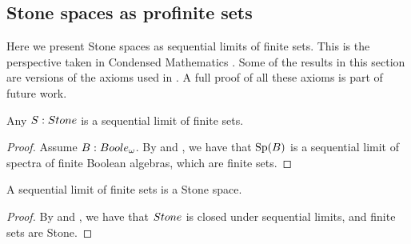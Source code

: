 
\subsection{Stone spaces as profinite sets}
Here we present Stone spaces as sequential limits of finite sets. 
This is the perspective taken in Condensed Mathematics \cite{Condensed,Dagur,Scholze}.
Some of the results in this section are versions of the axioms used in 
\cite{bc24}. A full proof of all these axioms is part of future work. 

\begin{lemma}
  Any $S:\Stone$ is a sequential limit of finite sets. 
\end{lemma}
\begin{proof}
  Assume $B:\Boole$. By  and , %
 we have that $\operatorname{Sp}(B)$ is a sequential limit of spectra of finite Boolean algebras, which are finite sets. 
\end{proof}

\begin{lemma}\label{StoneAreProfinite} 
  A sequential limit of finite sets is a Stone space. 
\end{lemma}
\begin{proof}
  By  and %
  , 
  we have that $\Stone$ is closed under sequential limits, and finite sets are Stone.
\end{proof}

